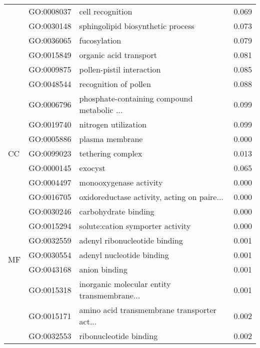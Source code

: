 \begin{longtable}{lllr}
   & GO:0008037 &                             cell recognition &         0.069 \\
   & GO:0030148 &            sphingolipid biosynthetic process &         0.073 \\
   & GO:0036065 &                                 fucosylation &         0.079 \\
   & GO:0015849 &                       organic acid transport &         0.081 \\
   & GO:0009875 &                    pollen-pistil interaction &         0.085 \\
   & GO:0048544 &                        recognition of pollen &         0.088 \\
   & GO:0006796 &  phosphate-containing compound metabolic ... &         0.099 \\
   & GO:0019740 &                         nitrogen utilization &         0.099 \\
\cline{1-4}
\multirow{3}{*}{CC} & GO:0005886 &                              plasma membrane &         0.000 \\
   & GO:0099023 &                            tethering complex &         0.013 \\
   & GO:0000145 &                                      exocyst &         0.065 \\
\cline{1-4}
\multirow{69}{*}{MF} & GO:0004497 &                       monooxygenase activity &         0.000 \\
   & GO:0016705 &  oxidoreductase activity, acting on paire... &         0.000 \\
   & GO:0030246 &                         carbohydrate binding &         0.000 \\
   & GO:0015294 &             solute:cation symporter activity &         0.000 \\
   & GO:0032559 &                adenyl ribonucleotide binding &         0.001 \\
   & GO:0030554 &                    adenyl nucleotide binding &         0.001 \\
   & GO:0043168 &                                anion binding &         0.001 \\
   & GO:0015318 &  inorganic molecular entity transmembrane... &         0.001 \\
   & GO:0015171 &  amino acid transmembrane transporter act... &         0.002 \\
   & GO:0032553 &                       ribonucleotide binding &         0.002 \\

\end{longtable}
